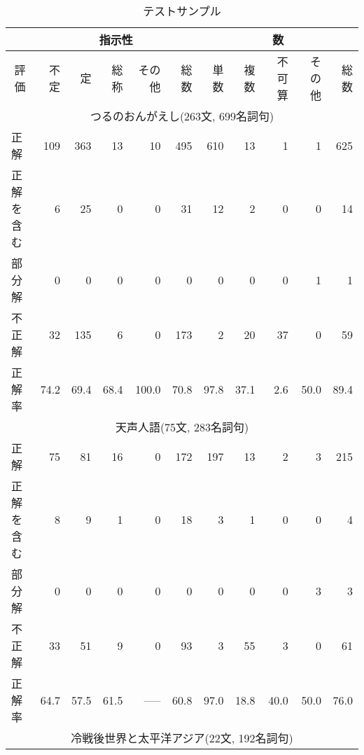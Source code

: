 \begin{table}[t]

  \caption{テストサンプル}\label{tab:turu_d}

\begin{center}


{

\begin{tabular}[c]{|l|r|r|r|r|r|r|r|r|r|r|} \hline
 & \multicolumn{5}{|c|}{指示性}  &  \multicolumn{5}{c|}{数}  \\ \hline 
\multicolumn{1}{|c|}{評価}  &  不定  &  定    &  総称 &  その他 &   総数  &  単数  &  複数    &  不可算 &  その他 &   総数    \\ \hline 
\multicolumn{11}{|c|}{つるのおんがえし(263文, 699名詞句)} \\ \hline 
   正解   &     109  &    363  &      13  &      10  &   495   &     610  &      13  &       1  &       1  &     625  \\ 
正解を含む&       6  &      25  &       0  &       0  &      31  &      12  &       2  &       0  &       0  &      14   \\ 
  部分解  &       0  &       0  &       0  &       0  &       0  &       0  &       0  &       0  &       1  &       1   \\ 
  不正解  &      32  &     135  &       6  &       0  &     173   &       2  &      20  &      37  &       0  &      59  \\ 
\hline
  正解率   &    74.2  &    69.4  &    68.4  &   100.0  &    70.8   &    97.8  &    37.1  &     2.6  &    50.0  &    89.4    \\ \hline 
\multicolumn{11}{|c|}{天声人語(75文, 283名詞句)} \\ \hline 
   正解   &      75  &    81  &      16  &       0  &   172  &     197  &      13  &       2  &       3  &     215   \\ 
正解を含む&       8  &       9  &       1  &       0  &      18 &       3  &       1  &       0  &       0  &       4    \\ 
  部分解  &       0  &       0  &       0  &       0  &       0   &       0  &       0  &       0  &       3  &       3     \\ 
  不正解  &      33  &      51  &       9  &       0  &      93  &       3  &      55  &       3  &       0  &      61    \\ 
\hline
  正解率   &    64.7  &    57.5  &    61.5  &    ----- &    60.8   &    97.0  &    18.8  &    40.0  &    50.0  &    76.0    \\ \hline 
\multicolumn{11}{|c|}{冷戦後世界と太平洋アジア(22文, 192名詞句)} \\ \hline 

\end{tabular}}
\end{center}
\end{table}
